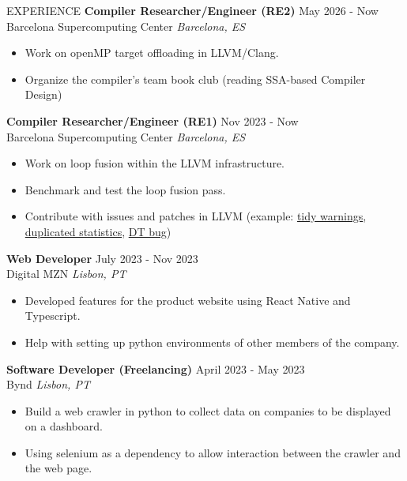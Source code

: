 \documentclass{resume} %
\begin{document}

\begin{rSection}{EXPERIENCE}
  \textbf{Compiler Researcher/Engineer (RE2)} \hfill May 2026 - Now\\
  Barcelona Supercomputing Center \hfill \textit{Barcelona, ES}
  \begin{itemize}
    \itemsep -3pt {}
  \item Work on openMP target offloading in LLVM/Clang.
  \item Organize the compiler's team book club (reading SSA-based Compiler Design)
  \end{itemize}

  \textbf{Compiler Researcher/Engineer (RE1)} \hfill Nov 2023 - Now\\
  Barcelona Supercomputing Center \hfill \textit{Barcelona, ES}
  \begin{itemize}
    \itemsep -3pt {}
  \item Work on loop fusion within the LLVM infrastructure.
  \item Benchmark and test the loop fusion pass.
  \item Contribute with issues and patches in LLVM (example: \href{https://github.com/llvm/llvm-project/pull/184993}{tidy warnings},
    \href{https://github.com/llvm/llvm-project/pull/187744}{duplicated statistics},
    \href{https://github.com/llvm/llvm-project/pull/193641}{DT bug})
  \end{itemize}


  \textbf{Web Developer} \hfill July 2023 - Nov 2023\\
  Digital MZN \hfill \textit{Lisbon, PT}
  \begin{itemize}
    \itemsep -3pt {}
  \item Developed features for the product website using React Native and Typescript.
  \item Help with setting up python environments of other members of the company.
  \end{itemize}
  
  \textbf{Software Developer (Freelancing)} \hfill April 2023 - May 2023\\
  Bynd \hfill \textit{Lisbon, PT}
  \begin{itemize}
    \itemsep -3pt {}    
  \item Build a web crawler in python to collect data on companies to
    be displayed on a dashboard.
  \item Using selenium as a dependency to allow interaction between the
    crawler and the web page.
  \end{itemize}


\end{rSection}
\end{document}
